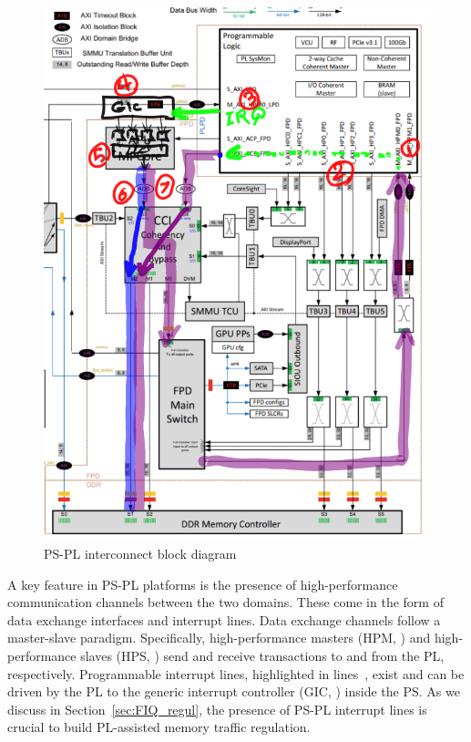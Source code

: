 \begin{figure}[ht!]
  \centering
  \includegraphics[scale=0.4]{images/ps-pl-interconnect.png}
  \caption{PS-PL interconnect block diagram}
  \label{fig:PS-PL-diagram}
\end{figure}

A key feature in PS-PL platforms is the presence of high-performance
communication channels between the two domains. These come in the form
of data exchange interfaces and interrupt lines. Data exchange
channels follow a master-slave paradigm. Specifically,
high-performance masters (HPM, ) and
high-performance slaves (HPS, ) send
and receive transactions to and from the PL,
respectively. Programmable interrupt lines, highlighted in
lines~, exist and can be driven by
the PL to the generic interrupt controller (GIC,
) inside the PS. As we discuss in
Section~\ref{sec:FIQ_regul}, the presence of PS-PL interrupt lines is
crucial to build PL-assisted memory traffic regulation.

